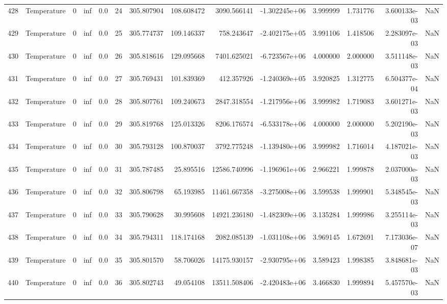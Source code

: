 \begin{tabular}{llrrrrrrrrrrrr}
428 &  Temperature &       0 &  inf &  0.0 &   24 &  305.807904 &   108.608472 &    3090.566141 & -1.302245e+06 &  3.999999 &  1.731776 &  3.600133e-03 &      NaN \\
429 &  Temperature &       0 &  inf &  0.0 &   25 &  305.774737 &   109.146337 &     758.243647 & -2.402175e+05 &  3.991106 &  1.418506 &  2.283097e-03 &      NaN \\
430 &  Temperature &       0 &  inf &  0.0 &   26 &  305.818616 &   129.095668 &    7401.625021 & -6.723567e+06 &  4.000000 &  2.000000 &  3.511148e-03 &      NaN \\
431 &  Temperature &       0 &  inf &  0.0 &   27 &  305.769431 &   101.839369 &     412.357926 & -1.240369e+05 &  3.920825 &  1.312775 &  6.504377e-04 &      NaN \\
432 &  Temperature &       0 &  inf &  0.0 &   28 &  305.807761 &   109.240673 &    2847.318554 & -1.217956e+06 &  3.999982 &  1.719083 &  3.601271e-03 &      NaN \\
433 &  Temperature &       0 &  inf &  0.0 &   29 &  305.819768 &   125.013326 &    8206.176574 & -6.533178e+06 &  4.000000 &  2.000000 &  5.202190e-03 &      NaN \\
434 &  Temperature &       0 &  inf &  0.0 &   30 &  305.793128 &   100.870037 &    3792.775248 & -1.139480e+06 &  3.999982 &  1.716014 &  4.187021e-03 &      NaN \\
435 &  Temperature &       0 &  inf &  0.0 &   31 &  305.787485 &    25.895516 &   12586.740996 & -1.196961e+06 &  2.966221 &  1.999878 &  2.037000e-03 &      NaN \\
436 &  Temperature &       0 &  inf &  0.0 &   32 &  305.806798 &    65.193985 &   11461.667358 & -3.275008e+06 &  3.599538 &  1.999901 &  5.348545e-03 &      NaN \\
437 &  Temperature &       0 &  inf &  0.0 &   33 &  305.790628 &    30.995608 &   14921.236180 & -1.482309e+06 &  3.135284 &  1.999986 &  3.255114e-03 &      NaN \\
438 &  Temperature &       0 &  inf &  0.0 &   34 &  305.794311 &   118.174168 &    2082.085139 & -1.031108e+06 &  3.969145 &  1.672691 &  7.173036e-07 &      NaN \\
439 &  Temperature &       0 &  inf &  0.0 &   35 &  305.801570 &    58.706026 &   14175.930157 & -2.930795e+06 &  3.589423 &  1.998385 &  3.848681e-03 &      NaN \\
440 &  Temperature &       0 &  inf &  0.0 &   36 &  305.802743 &    49.054108 &   13511.508406 & -2.420483e+06 &  3.466830 &  1.999894 &  5.457570e-03 &      NaN \\

\end{tabular}
